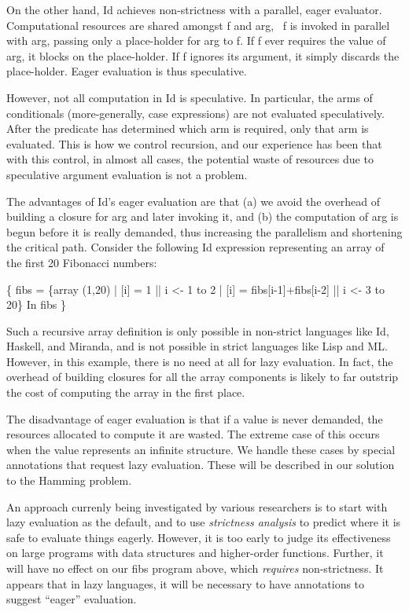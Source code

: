 On the other hand, Id achieves non-strictness with a parallel, eager
evaluator.  Computational resources are shared amongst {\cf f} and
{\cf arg}, \ie\ {\cf f} is invoked in parallel with {\cf arg}, passing
only a place-holder for {\cf arg} to {\cf f}.  If {\cf f} ever
requires the value of {\cf arg}, it blocks on the place-holder.  If
{\cf f} ignores its argument, it simply discards the place-holder.
Eager evaluation is thus speculative.

However, not all computation in Id is speculative.  In particular, the
arms of conditionals (more-generally, {\cf case} expressions) are not
evaluated speculatively.  After the predicate has determined which arm
is required, only that arm is evaluated.  This is how we control
recursion, and our experience has been that with this control, in
almost all cases, the potential waste of resources due to speculative
argument evaluation is not a problem.

The advantages of Id's eager evaluation are that (a) we avoid the
overhead of building a closure for {\cf arg} and later invoking it,
and (b) the computation of {\cf arg} is begun before it is really
demanded, thus increasing the parallelism and shortening the critical
path.  Consider the following Id expression representing an array of
the first 20 Fibonacci numbers:

\beginid
\{ fibs = \{array (1,20)
         | [i] = 1                   || i <- 1 to 2
         | [i] = fibs[i-1]+fibs[i-2] || i <- 3 to 20\}
In
  fibs \}
\endid

Such a recursive array definition is only possible in non-strict
languages like Id, Haskell, and Miranda, and is not possible in strict
languages like Lisp and ML.  However, in this example, there is no
need at all for lazy evaluation.  In fact, the overhead of building
closures for all the array components is likely to far outstrip the
cost of computing the array in the first place.

The disadvantage of eager evaluation is that if a value is never
demanded, the resources allocated to compute it are wasted.  The
extreme case of this occurs when the value represents an infinite
structure.  We handle these cases by special annotations that request
lazy evaluation.  These will be described in our solution to the
Hamming problem.

An approach currenly being investigated by various researchers is to
start with lazy evaluation as the default, and to use {\em strictness
analysis\/} to predict where it is safe to evaluate things eagerly.
However, it is too early to judge its effectiveness on large programs
with data structures and higher-order functions.  Further, it will
have no effect on our {\cf fibs} program above, which {\em requires\/}
non-strictness.  It appears that in lazy languages, it will be
necessary to have annotations to suggest ``eager'' evaluation.

